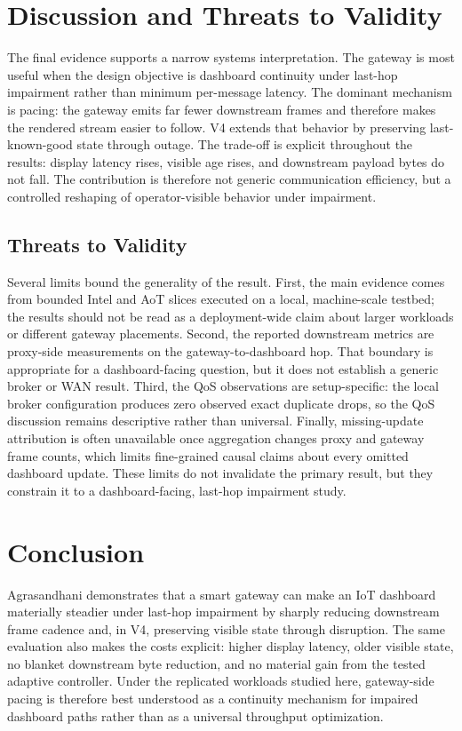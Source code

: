 \section{Discussion and Threats to Validity}

The final evidence supports a narrow systems interpretation. The gateway is most useful when the design objective is dashboard continuity under last-hop impairment rather than minimum per-message latency. The dominant mechanism is pacing: the gateway emits far fewer downstream frames and therefore makes the rendered stream easier to follow. V4 extends that behavior by preserving last-known-good state through outage. The trade-off is explicit throughout the results: display latency rises, visible age rises, and downstream payload bytes do not fall. The contribution is therefore not generic communication efficiency, but a controlled reshaping of operator-visible behavior under impairment.

\subsection{Threats to Validity}

Several limits bound the generality of the result. First, the main evidence comes from bounded Intel and AoT slices executed on a local, machine-scale testbed; the results should not be read as a deployment-wide claim about larger workloads or different gateway placements. Second, the reported downstream metrics are proxy-side measurements on the gateway-to-dashboard hop. That boundary is appropriate for a dashboard-facing question, but it does not establish a generic broker or WAN result. Third, the QoS observations are setup-specific: the local broker configuration produces zero observed exact duplicate drops, so the QoS discussion remains descriptive rather than universal. Finally, missing-update attribution is often unavailable once aggregation changes proxy and gateway frame counts, which limits fine-grained causal claims about every omitted dashboard update. These limits do not invalidate the primary result, but they constrain it to a dashboard-facing, last-hop impairment study.

\section{Conclusion}

Agrasandhani demonstrates that a smart gateway can make an IoT dashboard materially steadier under last-hop impairment by sharply reducing downstream frame cadence and, in V4, preserving visible state through disruption. The same evaluation also makes the costs explicit: higher display latency, older visible state, no blanket downstream byte reduction, and no material gain from the tested adaptive controller. Under the replicated workloads studied here, gateway-side pacing is therefore best understood as a continuity mechanism for impaired dashboard paths rather than as a universal throughput optimization.
